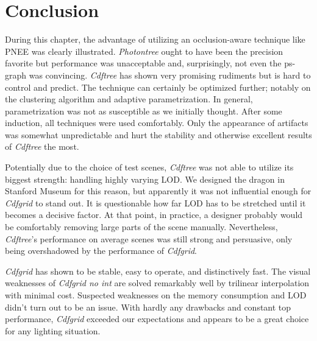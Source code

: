 \section{Conclusion}

During this chapter, the advantage of utilizing an occlusion-aware technique like PNEE was clearly illustrated. \textit{Photontree} ought to have been the precision favorite but performance was unacceptable and, surprisingly, not even the ps-graph was convincing. \textit{Cdftree} has shown very promising rudiments but is hard to control and predict. The technique can certainly be optimized further; notably on the clustering algorithm and adaptive parametrization. In general, parametrization was not as susceptible as we initially thought. After some induction, all techniques were used comfortably. Only the appearance of artifacts was somewhat unpredictable and hurt the stability and otherwise excellent results of \textit{Cdftree} the most. 

Potentially due to the choice of test scenes, \textit{Cdftree} was not able to utilize its biggest strength: handling highly varying LOD. We designed the dragon in Stanford Museum for this reason, but apparently it was not influential enough for \textit{Cdfgrid} to stand out. It is questionable how far LOD has to be stretched until it becomes a decisive factor. At that point, in practice, a designer probably would be comfortably removing large parts of the scene manually. Nevertheless, \textit{Cdftree}'s performance on average scenes was still strong and persuasive, only being overshadowed by the performance of \textit{Cdfgrid}.

\textit{Cdfgrid} has shown to be stable, easy to operate, and distinctively fast. The visual weaknesses of \textit{Cdfgrid no int} are solved remarkably well by trilinear interpolation with minimal cost. Suspected weaknesses on the memory consumption and LOD didn't turn out to be an issue. With hardly any drawbacks and constant top performance, \textit{Cdfgrid} exceeded our expectations and appears to be a great choice for any lighting situation.
